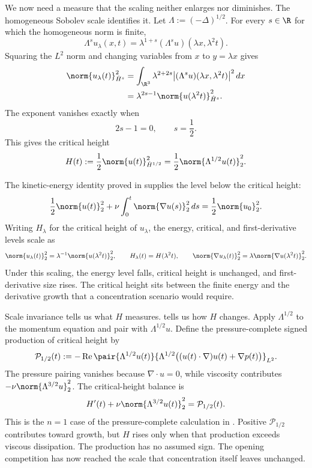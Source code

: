 We now need a measure that the \NavierStokes{} scaling neither enlarges nor diminishes.
The homogeneous Sobolev scale identifies it.
Let \(\Lambda:=(-\Delta)^{1/2}\).
For every \(s\in\R\) for which the homogeneous norm is finite,
\[
  \Lambda^s u_\lambda(x,t)
  =
  \lambda^{1+s}(\Lambda^s u)(\lambda x,\lambda^2t).
\]
Squaring the \(L^2\) norm and changing variables from \(x\) to \(y=\lambda x\) gives
\[
\begin{aligned}
  \norm{u_\lambda(t)}_{\dot H^s}^2
  &=
  \int_{\R^3}
  \lambda^{2+2s}
  \bigl|(\Lambda^s u)(\lambda x,\lambda^2t)\bigr|^2
  \,dx
  \\
  &=
  \lambda^{2s-1}
  \norm{u(\lambda^2t)}_{\dot H^s}^2.
\end{aligned}
\]
The exponent vanishes exactly when
\[
  2s-1=0,
  \qquad
  s=\frac12.
\]
This gives the critical height
\[
  H(t)
  :=
  \frac12\norm{u(t)}_{\dot H^{1/2}}^2
  =
  \frac12\norm{\Lambda^{1/2}u(t)}_2^2.
\]

The kinetic-energy identity proved in  supplies the level below the critical height:
\begin{equation}\label{eq:BodyEnergyIdentity}
  \frac12\norm{u(t)}_2^2
  +
  \nu\int_0^t\norm{\nabla u(s)}_2^2\,ds
  =
  \frac12\norm{u_0}_2^2.
\end{equation}
Writing \(H_\lambda\) for the critical height of \(u_\lambda\), the energy, critical, and first-derivative levels scale as
\[
  \norm{u_\lambda(t)}_2^2
  =
  \lambda^{-1}\norm{u(\lambda^2t)}_2^2,
  \qquad
  H_\lambda(t)=H(\lambda^2t),
  \qquad
  \norm{\nabla u_\lambda(t)}_2^2
  =
  \lambda\norm{\nabla u(\lambda^2t)}_2^2.
\]
Under this scaling, the energy level falls, critical height is unchanged, and first-derivative size rises.
The critical height sits between the finite energy and the derivative growth that a concentration scenario would require.


Scale invariance tells us what \(H\) measures.
\NavierStokes{} tells us how \(H\) changes.
Apply \(\Lambda^{1/2}\) to the momentum equation and pair with \(\Lambda^{1/2}u\).
Define the pressure-complete signed production of critical height by
\[
  \mathcal P_{1/2}(t)
  :=
  -\operatorname{Re}
  \pair
    {\Lambda^{1/2}u(t)}
    {\Lambda^{1/2}\bigl((u(t)\cdot\nabla)u(t)+\nabla p(t)\bigr)}_{L^2}.
\]
The pressure pairing vanishes because \(\nabla\cdot u=0\), while viscosity contributes \(-\nu\norm{\Lambda^{3/2}u}_2^2\).
The critical-height balance is
\[
  H'(t)
  +
  \nu\norm{\Lambda^{3/2}u(t)}_2^2
  =
  \mathcal P_{1/2}(t).
\]
This is the \(n=1\) case of the pressure-complete calculation in .
Positive \(\mathcal P_{1/2}\) contributes toward growth, but \(H\) rises only when that production exceeds viscous dissipation.
The production has no assumed sign.
The opening competition has now reached the scale that concentration itself leaves unchanged.

